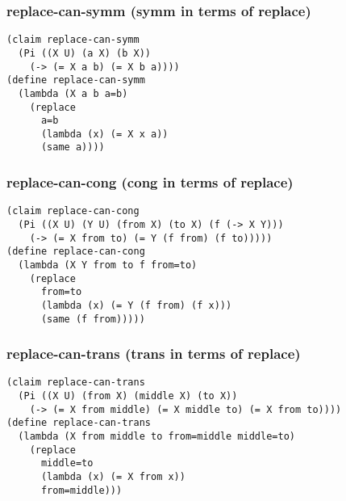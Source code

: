 \subsubsection{replace-can-symm (symm in terms of replace)} \label{code:replace-can-symm}
\begin{lstlisting}
(claim replace-can-symm
  (Pi ((X U) (a X) (b X))
    (-> (= X a b) (= X b a))))
(define replace-can-symm
  (lambda (X a b a=b)
    (replace
      a=b
      (lambda (x) (= X x a))
      (same a))))
\end{lstlisting}

\subsubsection{replace-can-cong (cong in terms of replace)} \label{code:replace-can-cong}
\begin{lstlisting}
(claim replace-can-cong
  (Pi ((X U) (Y U) (from X) (to X) (f (-> X Y)))
    (-> (= X from to) (= Y (f from) (f to)))))
(define replace-can-cong
  (lambda (X Y from to f from=to)
    (replace
      from=to
      (lambda (x) (= Y (f from) (f x)))
      (same (f from)))))
\end{lstlisting}

\subsubsection{replace-can-trans (trans in terms of replace)} \label{code:replace-can-trans}
\begin{lstlisting}
(claim replace-can-trans
  (Pi ((X U) (from X) (middle X) (to X))
    (-> (= X from middle) (= X middle to) (= X from to))))
(define replace-can-trans
  (lambda (X from middle to from=middle middle=to)
    (replace
      middle=to
      (lambda (x) (= X from x))
      from=middle)))
\end{lstlisting}


